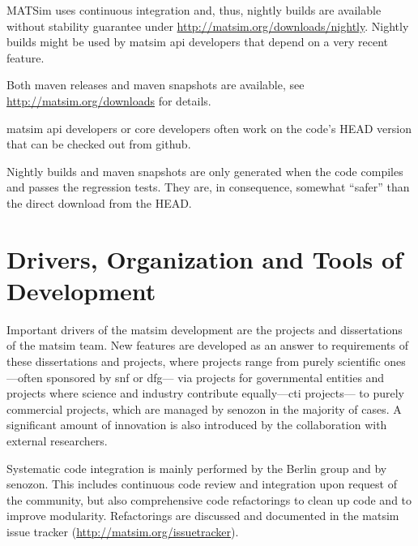 MATSim 
uses continuous integration and, thus, nightly builds are available without stability guarantee under \url{http://matsim.org/downloads/nightly}. Nightly builds might be used by \gls{matsim} \gls{api} developers that depend on a very recent feature. 

Both \gls{maven} releases and \gls{maven} snapshots are available, see \url{http://matsim.org/downloads} for details.

\gls{matsim} \gls{api} developers or core developers often work on the code's HEAD version that can be checked out from \gls{github}.

Nightly builds and maven snapshots are only generated when the code compiles and passes the regression tests.  They are, in consequence, somewhat ``safer'' than the direct download from the HEAD.

\section{Drivers, Organization and Tools of Development}
Important drivers of the \gls{matsim} development are the projects and dissertations of the \gls{matsim} team. 
New features are developed as an answer to requirements of these dissertations and projects, where projects range 
%
from purely scientific ones---often sponsored by \gls{snf} or \gls{dfg}---%
%
via projects for governmental entities
%
and projects where science and industry contribute equally---\eg \gls{cti} projects---%
%
to purely 
commercial projects, which are managed by \gls{senozon} in the majority of cases. 
%
A significant amount of innovation is also introduced by the collaboration with external researchers.

Systematic code integration is mainly performed by the Berlin group and by \gls{senozon}. 
This includes continuous code review and integration upon request of the community, but also comprehensive code refactorings to clean up
code and to 
improve modularity.  Refactorings are discussed and documented in the \gls{matsim} issue tracker (\url{http://matsim.org/issuetracker}).

